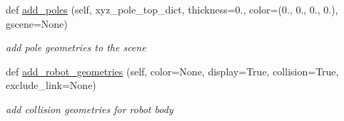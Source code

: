 \begin{DoxyCompactItemize}
def \hyperlink{classrnb-planning_1_1src_1_1pkg_1_1geometry_1_1builder_1_1scene__builder_1_1_scene_builder_a24657f84567fdda54f6091db17dd1383}{add\+\_\+poles} (self, xyz\+\_\+pole\+\_\+top\+\_\+dict, thickness=0., color=(0., 0., 0., 0.), gscene=None)
\begin{DoxyCompactList}\small\item\em add pole geometries to the scene \end{DoxyCompactList}\item 
\mbox{\label{classrnb-planning_1_1src_1_1pkg_1_1geometry_1_1builder_1_1scene__builder_1_1_scene_builder_a45754d96ea8bef7a3fd738b76b1abd86}} 
def \hyperlink{classrnb-planning_1_1src_1_1pkg_1_1geometry_1_1builder_1_1scene__builder_1_1_scene_builder_a45754d96ea8bef7a3fd738b76b1abd86}{add\+\_\+robot\+\_\+geometries} (self, color=None, display=True, collision=True, exclude\+\_\+link=None)
\begin{DoxyCompactList}\small\item\em add collision geometries for robot body \end{DoxyCompactList}\end{DoxyCompactItemize}
